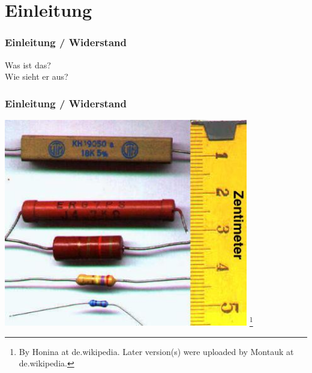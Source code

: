 

\subtitle{Technik Klasse E 04: \\
          Der Widerstand und seine Schaltungsarten \\[2em]}
\date{Stand 27.10.2014}



\section*{Einleitung}

\begin{frame}
    \frametitle{Einleitung / Widerstand}
    \begin{center}
        \Large{Was ist das?} \\
        \Large{Wie sieht er aus?}
    \end{center}
\end{frame}


\begin{frame}
    \frametitle{Einleitung / Widerstand}

    \begin{center}
        \includegraphics[width=0.8\textwidth]{e04/Widerstaende.jpg}
        \footnote{\tiny By Honina at de.wikipedia. Later version(s) were uploaded by Montauk at de.wikipedia.}
    \end{center}
 	

\end{frame}

